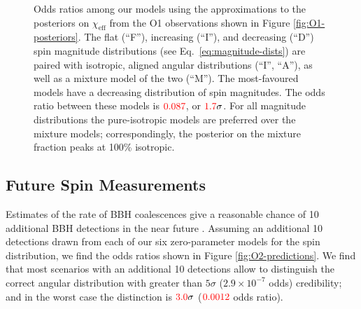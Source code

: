\documentclass[modern,linenumbers]{aastex61}
\newcommand{\chieff}{\chi_\mathrm{eff}}
\newcommand{\checkme}[1]{\textcolor{red}{#1}}
\newcommand{\OOneSigmaIsoAligned}{\checkme{1.7}}
\newcommand{\OOneOddsIsoAligned}{\checkme{0.087}}
\newcommand{\OTwoSigmaIsoAlignedMin}{\checkme{3.0}}
\newcommand{\OTwoOddsIsoAlignedMin}{\checkme{0.0012}}
\begin{document}
\begin{figure}
  \caption{Odds ratios among our models using the approximations to
    the posteriors on $\chieff$ from the O1 observations shown in
    Figure \ref{fig:O1-posteriors}.  The flat (``F''), increasing
    (``I''), and decreasing (``D'') spin magnitude distributions (see
    Eq.\ \eqref{eq:magnitude-dists}) are paired with isotropic,
    aligned angular distributions (``$\mathrm{I}$'',
    ``$\mathrm{A}$''), as well as a mixture model of the two
    (``$\mathrm{M}$'').  The most-favoured models have a decreasing
    distribution of spin magnitudes.  The odds ratio between these
    models is $\OOneOddsIsoAligned$, or $\OOneSigmaIsoAligned\sigma$.
    For all magnitude distributions the pure-isotropic models are
    preferred over the mixture models; correspondingly, the posterior
    on the mixture fraction peaks at 100\% isotropic.}
  \label{fig:O1-odds}
\end{figure}

\subsection{Future Spin Measurements}
\label{subsec:future}

Estimates of the rate of \ac{BBH} coalescences give a reasonable
chance of 10 additional \ac{BBH} detections in the near future
\citep{O1-BBH,2016ApJ...833L...1A,2016ApJS..227...14A}.  Assuming an
additional 10 detections drawn from each of our six zero-parameter
models for the spin distribution, we find the odds ratios shown in
Figure \ref{fig:O2-predictions}.  We find that most scenarios with an
additional 10 detections allow to distinguish the correct angular
distribution with greater than $5\sigma$ ($2.9 \times 10^{-7}$ odds)
credibility; and in the worst case the distinction is
$\OTwoSigmaIsoAlignedMin\sigma$ ($\OTwoOddsIsoAlignedMin$ odds ratio).
\end{document}
